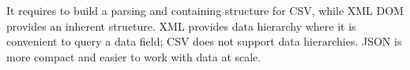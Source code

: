 It requires to build a parsing and containing structure for CSV, while XML DOM provides an inherent structure. XML provides data hierarchy where it is convenient to query a data field; CSV does not support data hierarchies. JSON is more compact and easier to work with data at scale\cite{json_advantage}.






